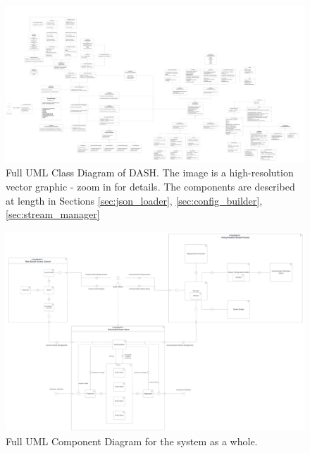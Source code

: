 \begin{figure}
    \centering
    \includegraphics[width=\linewidth]{img/DASH_full_class_diagram.pdf}
    \caption{Full UML Class Diagram of \ac{DASH}. The image is a high-resolution vector graphic - zoom in for details. The components are described at length in Sections \ref{sec:json_loader}, \ref{sec:config_builder}, \ref{sec:stream_manager}}
    \label{fig:full_class_diagram}
\end{figure}


\begin{figure}
    \centering
    \includegraphics[width=\linewidth]{img/Complete_Component_Diagram.pdf}
    \caption{Full UML Component Diagram for the system as a whole. }
    \label{app:component_diagram}
\end{figure}


